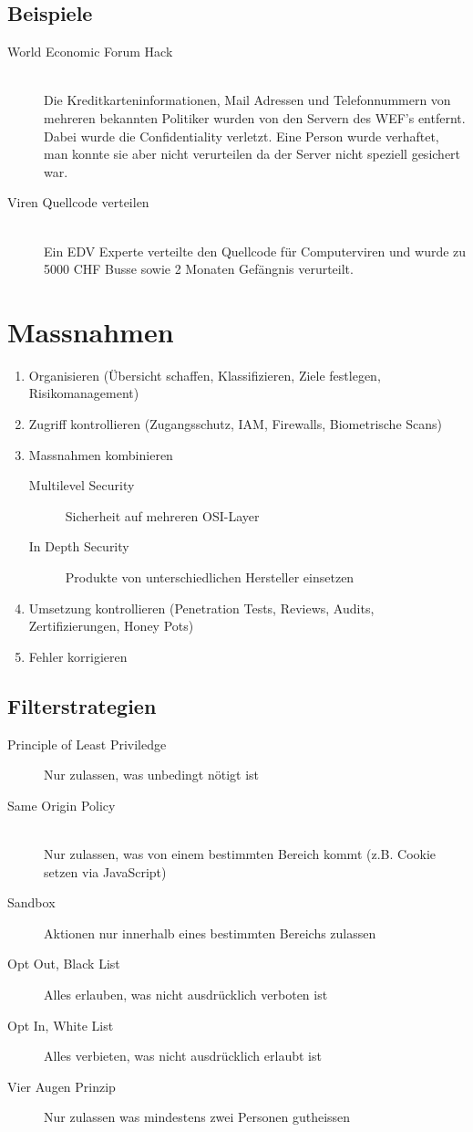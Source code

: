 \subsection{Beispiele}
\begin{description}
	\item[World Economic Forum Hack] \hfill \\ Die Kreditkarteninformationen, Mail Adressen und Telefonnummern von mehreren bekannten Politiker wurden von den Servern des WEF's entfernt. Dabei wurde die Confidentiality verletzt. Eine Person wurde verhaftet, man konnte sie aber nicht verurteilen da der Server nicht speziell gesichert war.
	\item[Viren Quellcode verteilen] \hfill \\ Ein EDV Experte verteilte den Quellcode für Computerviren und wurde zu 5000  CHF Busse sowie 2 Monaten Gefängnis verurteilt. 
\end{description}

\section{Massnahmen}
\begin{enumerate}
	\item Organisieren (Übersicht schaffen, Klassifizieren, Ziele festlegen, Risikomanagement)
	\item Zugriff kontrollieren (Zugangsschutz, IAM, Firewalls, Biometrische Scans)
	\item Massnahmen kombinieren
	\begin{description}
		\item[Multilevel Security] Sicherheit auf mehreren OSI-Layer
		\item[In Depth Security] Produkte von unterschiedlichen Hersteller einsetzen
	\end{description}
	\item Umsetzung kontrollieren (Penetration Tests, Reviews, Audits, Zertifizierungen, Honey Pots)
	\item Fehler korrigieren
\end{enumerate}

\subsection{Filterstrategien}
\begin{description}
	\item[Principle of Least Priviledge] Nur zulassen, was unbedingt nötigt ist
	\item[Same Origin Policy] \hfill \\
	Nur zulassen, was von einem bestimmten Bereich kommt (z.B. Cookie setzen via JavaScript)
	\item[Sandbox] Aktionen nur innerhalb eines bestimmten Bereichs zulassen
	\item[Opt Out, Black List] Alles erlauben, was nicht ausdrücklich verboten ist
	\item[Opt In, White List] Alles verbieten, was nicht ausdrücklich erlaubt ist
	\item[Vier Augen Prinzip] Nur zulassen was mindestens zwei Personen gutheissen
\end{description}


